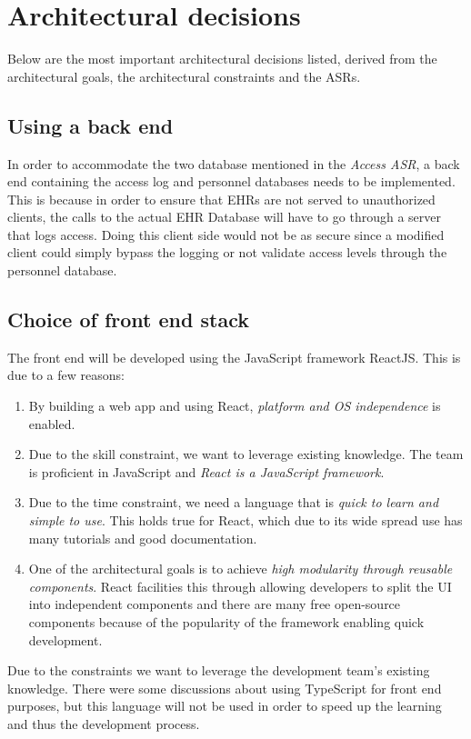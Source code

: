 \documentclass{article}
\begin{document}
\section{Architectural decisions}
Below are the most important architectural decisions listed, derived from the architectural goals, the architectural constraints and the ASRs.

\subsection{Using a back end}
In order to accommodate the two database mentioned in the \emph{Access ASR}, a back end containing the access log and personnel databases needs to be implemented. This is because in order to ensure that EHRs are not served to unauthorized clients, the calls to the actual EHR Database will have to go through a server that logs access. Doing this client side would not be as secure since a modified client could simply bypass the logging or not validate access levels through the personnel database.

\subsection{Choice of front end stack}
The front end will be developed using the JavaScript framework ReactJS. This is due to a few reasons:

\begin{enumerate}[label=(\roman*)]
\item By building a web app and using React, \emph{platform and OS independence} is enabled.
\item Due to the skill constraint, we want to leverage existing knowledge. The team is proficient in JavaScript and \emph{React is a JavaScript framework}.
\item Due to the time constraint, we need a language that is \emph{quick to learn and simple to use}. This holds true for React, which due to its wide spread use has many tutorials and good documentation.
\item One of the architectural goals is to achieve \emph{high modularity through reusable components}. React facilities this through allowing developers to split the UI into independent components and there are many free open-source components because of the popularity of the framework enabling quick development.
\end{enumerate}

Due to the constraints we want to leverage the development team's existing knowledge. There were some discussions about using TypeScript for front end purposes, but this language will not be used in order to speed up the learning and thus the development process.
\end{document}

